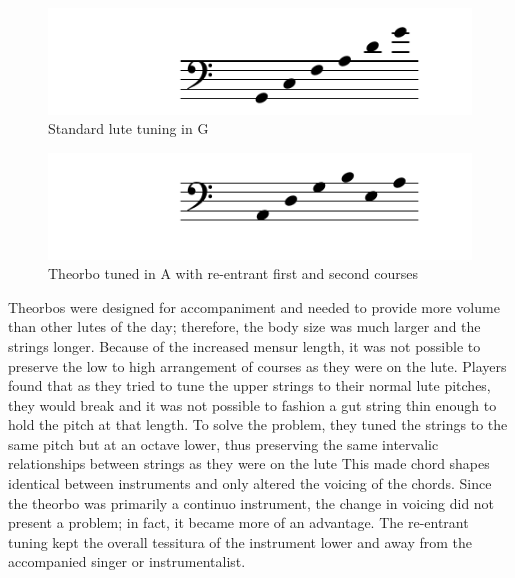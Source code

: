 \begin{figure}[h]
\centering
\includegraphics{examples/lute-tuning.pdf}
\caption{Standard lute tuning in G}
\label{g-lute}
\end{figure}
\begin{figure}[h]
\centering
\includegraphics{examples/theorbo-tuning.pdf}
\caption{Theorbo tuned in A with re-entrant first and second courses}
\label{a-theorbo}
\end{figure}

Theorbos were designed for accompaniment and needed to provide more volume than other
lutes of the day; therefore, the body size was much larger and the strings longer.
Because of the increased mensur length, it was not possible to preserve the low to high
arrangement of courses as they were on the lute. Players found that as they tried to tune
the upper strings to their normal lute pitches, they would break and it was not
possible to fashion a gut string thin enough to hold the pitch at that length.  To solve
the problem, they tuned the strings to the same pitch but at an octave lower, thus
preserving the same intervalic relationships between strings as they were on the lute  This
made chord shapes identical between instruments and only altered the voicing of the
chords. Since the theorbo was primarily a continuo instrument, the change in voicing did
not present a problem; in fact, it became more of an advantage.  The re-entrant tuning
kept the overall tessitura of the instrument lower and away from the accompanied singer or
instrumentalist.


